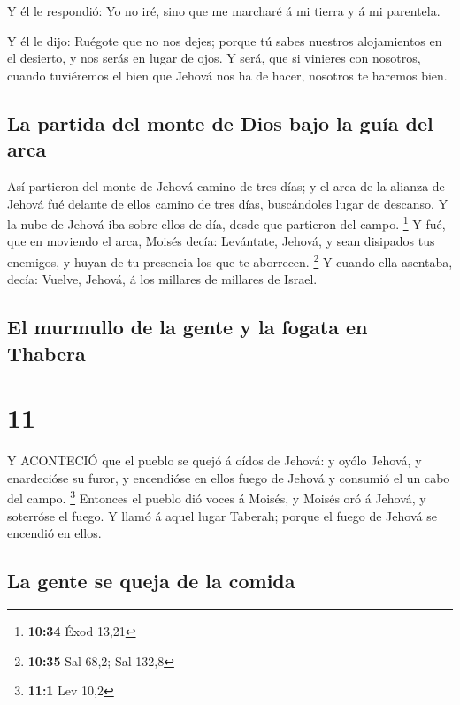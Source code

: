  Y él le respondió: Yo no iré, sino que me marcharé á mi
tierra y á mi parentela.

 Y él le dijo: Ruégote que no nos dejes; porque tú sabes
nuestros alojamientos en el desierto, y nos serás en lugar de ojos.
 Y será, que si vinieres con nosotros, cuando tuviéremos el
bien que Jehová nos ha de hacer, nosotros te haremos bien.

\hypertarget{la-partida-del-monte-de-dios-bajo-la-guuxeda-del-arca}{%
\subsection{La partida del monte de Dios bajo la guía del
arca}\label{la-partida-del-monte-de-dios-bajo-la-guuxeda-del-arca}}

 Así partieron del monte de Jehová camino de tres días; y
el arca de la alianza de Jehová fué delante de ellos camino de tres
días, buscándoles lugar de descanso.  Y la nube de Jehová
iba sobre ellos de día, desde que partieron del campo. \footnote{\textbf{10:34}
  Éxod 13,21}  Y fué, que en moviendo el arca, Moisés
decía: Levántate, Jehová, y sean disipados tus enemigos, y huyan de tu
presencia los que te aborrecen. \footnote{\textbf{10:35} Sal 68,2; Sal
  132,8}  Y cuando ella asentaba, decía: Vuelve, Jehová, á
los millares de millares de Israel.

\hypertarget{el-murmullo-de-la-gente-y-la-fogata-en-thabera}{%
\subsection{El murmullo de la gente y la fogata en
Thabera}\label{el-murmullo-de-la-gente-y-la-fogata-en-thabera}}

\hypertarget{section-10}{%
\section{11}\label{section-10}}

 Y ACONTECIÓ que el pueblo se quejó á oídos de Jehová: y
oyólo Jehová, y enardecióse su furor, y encendióse en ellos fuego de
Jehová y consumió el un cabo del campo. \footnote{\textbf{11:1} Lev 10,2}
 Entonces el pueblo dió voces á Moisés, y Moisés oró á
Jehová, y soterróse el fuego.  Y llamó á aquel lugar
Taberah; porque el fuego de Jehová se encendió en ellos.

\hypertarget{la-gente-se-queja-de-la-comida}{%
\subsection{La gente se queja de la
comida}\label{la-gente-se-queja-de-la-comida}}

